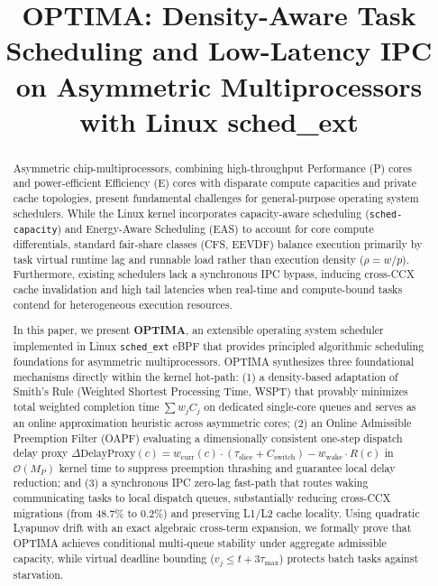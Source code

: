 \documentclass[conference]{IEEEtran}
\title{OPTIMA: Density-Aware Task Scheduling and Low-Latency IPC on Asymmetric Multiprocessors with Linux sched\_ext}
\author{\IEEEauthorblockN{Risheendra MN}
\IEEEauthorblockA{\texttt{rishindra.hackbox@gmail.com} \\
ORCID: \url{https://orcid.org/0009-0004-5568-614X}}}
\begin{document}
\maketitle

\begin{abstract}
\normalfont
Asymmetric chip-multiprocessors, combining high-throughput Performance (P) cores and power-efficient Efficiency (E) cores with disparate compute capacities and private cache topologies, present fundamental challenges for general-purpose operating system schedulers. While the Linux kernel incorporates capacity-aware scheduling (\texttt{sched-capacity}) and Energy-Aware Scheduling (EAS) to account for core compute differentials, standard fair-share classes (CFS, EEVDF) balance execution primarily by task virtual runtime lag and runnable load rather than execution density ($\rho = w / p$). Furthermore, existing schedulers lack a synchronous IPC bypass, inducing cross-CCX cache invalidation and high tail latencies when real-time and compute-bound tasks contend for heterogeneous execution resources.

In this paper, we present \textbf{OPTIMA}, an extensible operating system scheduler implemented in Linux \texttt{sched\_ext} eBPF that provides principled algorithmic scheduling foundations for asymmetric multiprocessors. OPTIMA synthesizes three foundational mechanisms directly within the kernel hot-path: (1) a density-based adaptation of Smith's Rule (Weighted Shortest Processing Time, WSPT) that provably minimizes total weighted completion time $\sum w_j C_j$ on dedicated single-core queues and serves as an online approximation heuristic across asymmetric cores; (2) an Online Admissible Preemption Filter (OAPF) evaluating a dimensionally consistent one-step dispatch delay proxy $\Delta\mathrm{DelayProxy}(c) = w_{\mathrm{curr}}(c) \cdot (\tau_{\mathrm{slice}} + C_{\mathrm{switch}}) - w_{\mathrm{wake}} \cdot R(c)$ in $\mathcal{O}(M_P)$ kernel time to suppress preemption thrashing and guarantee local delay reduction; and (3) a synchronous IPC zero-lag fast-path that routes waking communicating tasks to local dispatch queues, substantially reducing cross-CCX migrations (from 48.7\% to 0.2\%) and preserving L1/L2 cache locality. Using quadratic Lyapunov drift with an exact algebraic cross-term expansion, we formally prove that OPTIMA achieves conditional multi-queue stability under aggregate admissible capacity, while virtual deadline bounding ($v_j \le t + 3\tau_{\max}$) protects batch tasks against starvation.


\end{abstract}
\end{document}
